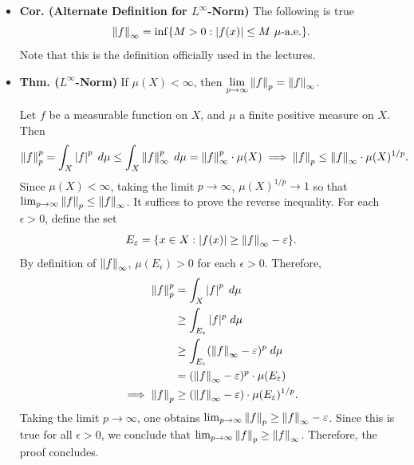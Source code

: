 \documentclass{article}
\begin{document}
\begin{itemize}
\begin{equation}
	\end{equation}
	\item \textbf{Cor. (Alternate Definition for $L^{\infty}$-Norm)} The following is true 
	\begin{equation}
		\norm{f}_{\infty} = \inf\brac*{M > 0: \abs{f(x)} \leq M \text{ $\mu$-a.e.}}.
	\end{equation}
	Note that this is the definition officially used in the lectures. 
	\item \textbf{Thm. ($L^{\infty}$-Norm)} If $\mu(X) < \infty$, then $\lim\limits_{p \to \infty}\left\Vert f \right\Vert_{p} = \left\Vert f \right\Vert_{\infty}$.\newline
	\begin{solutions}
		Let $f$ be a measurable function on $X$, and $\mu$ a finite positive measure on $X$. Then 
		\begin{equation}
			\left\Vert f \right\Vert_{p}^{p} = \int_{X}\left| f \right|^{p}\;d\mu \leq \int_{X} \left\Vert f \right\Vert_{\infty}^{p}\;d\mu = \left\Vert f \right\Vert_{\infty}^{p}\cdot \mu(X) \implies \left\Vert f \right\Vert_{p} \leq \left\Vert f \right\Vert_{\infty} \cdot \mu(X)^{1/p}. 
		\end{equation}
		Since $\mu(X) < \infty$, taking the limit $p \to \infty$, $\mu(X)^{1/p} \to 1$ so that $\lim_{p \to \infty}\left\Vert f \right\Vert_{p} \leq \left\Vert f \right\Vert_{\infty}$. It suffices to prove the reverse inequality. For each $\epsilon > 0$, define the set 
		\begin{equation}
			E_{\epsilon} = \brac*{x \in X: |f(x)| \geq \norm{f}_{\infty} - \epsilon}. 
		\end{equation} 
		By definition of $\left\Vert f \right\Vert_{\infty}$, $\mu(E_{\epsilon}) > 0$ for each $\epsilon > 0$. Therefore, 
		\begin{align}
			\begin{split}
				\left\Vert f \right\Vert_{p}^{p} &= \int_{X}\left| f \right|^{p}\;d\mu \\
				&\geq \int_{E_{\varepsilon}}|f|^{p}\;d\mu \\
				&\geq \int_{E_{\varepsilon}}(\left\Vert f \right\Vert_{\infty} - \varepsilon)^{p}\;d\mu \\
				&= (\left\Vert f \right\Vert_{\infty} - \varepsilon)^{p} \cdot \mu(E_{\varepsilon}) \\
				\implies 
				\left\Vert f \right\Vert_{p} &\geq (\left\Vert f \right\Vert_{\infty} - \varepsilon) \cdot \mu(E_{\varepsilon})^{1/p}.
			\end{split}
		\end{align}
		Taking the limit $p \to \infty$, one obtains $\lim_{p \to \infty}\left\Vert f \right\Vert_{p} \geq \left\Vert f \right\Vert_{\infty} - \varepsilon$. Since this is true for all $\epsilon > 0$, we conclude that $\lim_{p \to \infty}\left\Vert f \right\Vert_{p} \geq \left\Vert f \right\Vert_{\infty}$. Therefore, the proof concludes. 
	\end{solutions}
\end{itemize}
\newpage 
\end{document}
